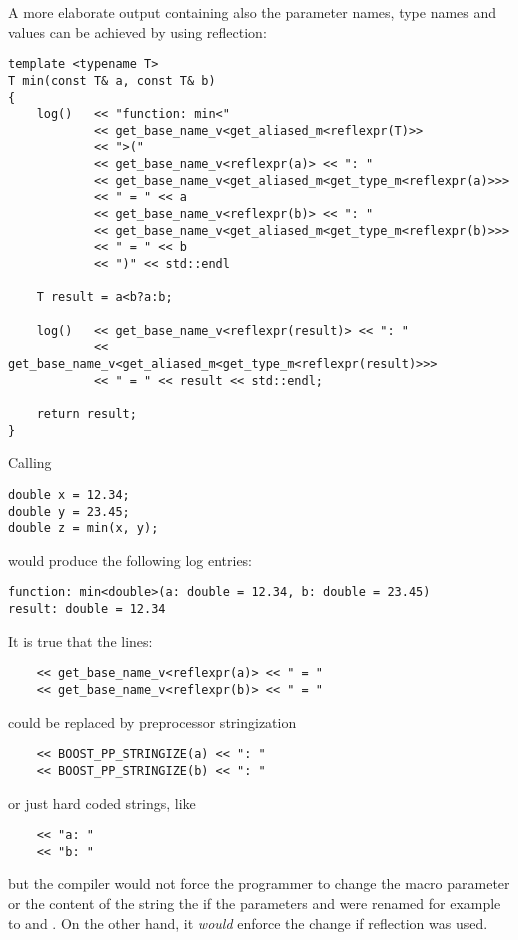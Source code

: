 A more elaborate output containing also the parameter names, type names and values
can be achieved by using reflection:

\begin{verbatim}
template <typename T>
T min(const T& a, const T& b)
{
	log()   << "function: min<"
	        << get_base_name_v<get_aliased_m<reflexpr(T)>>
	        << ">("
	        << get_base_name_v<reflexpr(a)> << ": "
	        << get_base_name_v<get_aliased_m<get_type_m<reflexpr(a)>>>
	        << " = " << a
	        << get_base_name_v<reflexpr(b)> << ": "
	        << get_base_name_v<get_aliased_m<get_type_m<reflexpr(b)>>>
	        << " = " << b
	        << ")" << std::endl

	T result = a<b?a:b;

	log()   << get_base_name_v<reflexpr(result)> << ": "
	        << get_base_name_v<get_aliased_m<get_type_m<reflexpr(result)>>>
	        << " = " << result << std::endl;

	return result;
}
\end{verbatim}

Calling

\begin{verbatim}
double x = 12.34;
double y = 23.45;
double z = min(x, y);
\end{verbatim}

would produce the following log entries:

\begin{verbatim}
function: min<double>(a: double = 12.34, b: double = 23.45)
result: double = 12.34
\end{verbatim}


It is true that the lines:
\begin{verbatim}
	<< get_base_name_v<reflexpr(a)> << " = "
	<< get_base_name_v<reflexpr(b)> << " = "
\end{verbatim}

could be replaced by preprocessor stringization

\begin{verbatim}
	<< BOOST_PP_STRINGIZE(a) << ": "
	<< BOOST_PP_STRINGIZE(b) << ": "
\end{verbatim}

or just hard coded strings, like

\begin{verbatim}
	<< "a: "
	<< "b: "
\end{verbatim}

but the compiler would not force the programmer to change the macro parameter
or the content of the string the if the parameters \verb@a@ and \verb@b@ were renamed
for example to \verb@first@ and \verb@second@. On the other hand, it {\em would}
enforce the change if reflection was used.

